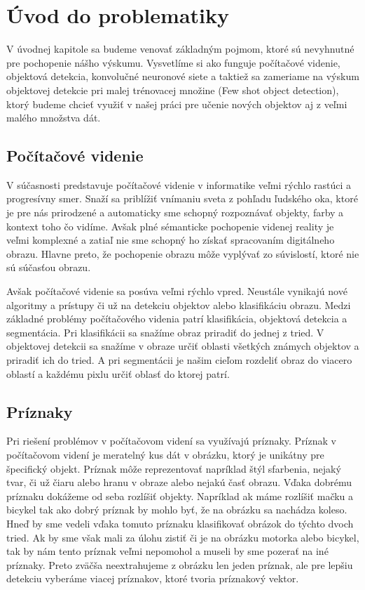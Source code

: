 \chapter{Úvod do problematiky}\label{chap:issues_overview}

V úvodnej kapitole sa budeme venovať základným pojmom, ktoré sú nevyhnutné pre pochopenie nášho výskumu. Vysvetlíme si ako funguje počítačové videnie, objektová detekcia, konvolučné neuronové siete a taktiež sa zameriame na výskum objektovej detekcie pri malej trénovacej množine (Few shot object detection), ktorý budeme chcieť využiť v našej práci pre učenie nových objektov aj z veľmi malého množstva dát.

\section{Počítačové videnie}


\setlength{\parindent}{20pt}

V súčasnosti predstavuje počítačové videnie v informatike veľmi rýchlo rastúci a progresívny smer. Snaží sa priblížiť vnímaniu sveta z pohľadu ľudského oka, ktoré je pre nás prirodzené a automaticky sme schopný rozpoznávať objekty, farby a kontext toho čo vidíme. Avšak plné sémanticke pochopenie videnej reality je veľmi komplexné a zatiaľ nie sme schopný ho získať spracovaním digitálneho obrazu. Hlavne preto, že pochopenie obrazu môže vyplývať zo súvislostí, ktoré nie sú súčasťou obrazu.

Avšak počítačové videnie sa posúva veľmi rýchlo vpred. Neustále vynikajú nové algoritmy a prístupy či už na detekciu objektov alebo klasifikáciu obrazu. Medzi základné problémy počítačového videnia patrí klasifikácia, objektová detekcia a segmentácia. Pri klasifikácii sa snažíme obraz priradiť do jednej z tried. V objektovej detekcii sa snažíme v obraze určiť oblasti všetkých známych objektov a priradiť ich do tried. A pri segmentácii je našim cieľom rozdeliť obraz do viacero oblastí a každému pixlu určiť oblasť do ktorej patrí. 

\section{Príznaky}

Pri riešení problémov v počítačovom videní sa využívajú príznaky. Príznak v počítačovom videní je meratelný kus dát v obrázku, ktorý je unikátny pre špecifický objekt. Príznak môže reprezentovať napríklad štýl sfarbenia, nejaký tvar, či už čiaru alebo hranu v obraze alebo nejakú časť obrazu. Vďaka dobrému príznaku dokážeme od seba rozlíšiť objekty. Napríklad ak máme rozlíšiť mačku a bicykel tak ako dobrý príznak by mohlo byť, že na obrázku sa nachádza koleso. Hneď by sme vedeli vďaka tomuto príznaku klasifikovať obrázok do týchto dvoch tried. Ak by sme však mali za úlohu zistiť či je na obrázku motorka alebo bicykel, tak by nám tento príznak veľmi nepomohol a museli by sme pozerať na iné príznaky. Preto zväčša neextrahujeme z obrázku len jeden príznak, ale pre lepšiu detekciu vyberáme viacej príznakov, ktoré tvoria príznakový vektor. 

